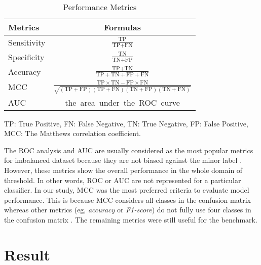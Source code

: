 \documentclass[conference]{IEEEtran}
\begin{document}
\begin{table}[htbp]
    \centering
    \begin{threeparttable}
        \caption{Performance Metrics}
        \label{metrics}
        
        \begin{tabular}{lc}
            \hline
            \textbf{Metrics}        & \textbf{Formulas\tnote{\textdagger}} \\
            \hline
            Sensitivity    & $\frac{\text{TP}}{\text{TP} + \text{FN}}$\\
            Specificity    & $\frac{\text{TN}}{\text{TN} + \text{FP}}$ \\
            Accuracy    & $\frac{\text{TP}+\text{TN}}{\text{TP}+\text{TN}+\text{FP}+\text{FN}}$\\
            MCC            & $\frac{\text{TP} \times \text{TN} - \text{FP} \times \text{FN}}{\sqrt{(\text{TP}+\text{FP})(\text{TP}+\text{FN})(\text{TN}+\text{FP})(\text{TN}+\text{FN})}}$\\
            AUC            & \mbox{the area under the ROC curve} \\
            \hline
        \end{tabular}
        \begin{tablenotes}
            \footnotesize
            \item[\textdagger] TP: True Positive, FN: False Negative, TN: True Negative, FP: False Positive, MCC: The Matthews correlation coefficient.
        \end{tablenotes}
    \end{threeparttable}
\end{table}

The ROC analysis and AUC are usually considered as the most popular metrics for imbalanced dataset because they are not biased against the minor label \cite{Kotsiantis2006, Guo2009}. However, these metrics show the overall performance in the whole domain of threshold. In other words, ROC or AUC are not represented for a particular classifier. In our study, MCC was the most preferred criteria to evaluate model performance. This is because MCC considers all classes in the confusion matrix whereas other metrics (eg, \textit{accuracy} or \textit{F1-score}) do not fully use four classes in the confusion matrix \cite{Chicco2017}. The remaining metrics were still useful for the benchmark. 
\section{Result}
\end{document}
